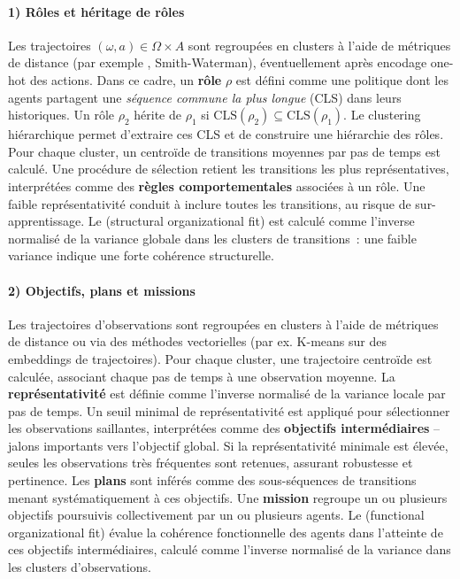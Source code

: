 \paragraph{1) Rôles et héritage de rôles}
Les trajectoires $(\omega, a) \in \Omega \times A$ sont regroupées en clusters à l’aide de métriques de distance (par exemple , Smith-Waterman), éventuellement après encodage one-hot des actions.
Dans ce cadre, un \textbf{rôle} $\rho$ est défini comme une politique dont les agents partagent une \textit{séquence commune la plus longue} (CLS) dans leurs historiques.
Un rôle $\rho_2$ hérite de $\rho_1$ si $\text{CLS}(\rho_2) \subseteq \text{CLS}(\rho_1)$.
Le clustering hiérarchique permet d’extraire ces CLS et de construire une hiérarchie des rôles.
Pour chaque cluster, un centroïde de transitions moyennes par pas de temps est calculé. Une procédure de sélection retient les transitions les plus représentatives, interprétées comme des \textbf{règles comportementales} associées à un rôle.
Une faible représentativité conduit à inclure toutes les transitions, au risque de sur-apprentissage.
Le \textbf{} (structural organizational fit) est calculé comme l’inverse normalisé de la variance globale dans les clusters de transitions~: une faible variance indique une forte cohérence structurelle.

\paragraph{2) Objectifs, plans et missions}
Les trajectoires d’observations sont regroupées en clusters à l’aide de métriques de distance ou via des méthodes vectorielles (par ex. K-means sur des embeddings de trajectoires). Pour chaque cluster, une trajectoire centroïde est calculée, associant chaque pas de temps à une observation moyenne.
La \textbf{représentativité} est définie comme l’inverse normalisé de la variance locale par pas de temps.
Un seuil minimal de représentativité est appliqué pour sélectionner les observations saillantes, interprétées comme des \textbf{objectifs intermédiaires} – jalons importants vers l’objectif global.
Si la représentativité minimale est élevée, seules les observations très fréquentes sont retenues, assurant robustesse et pertinence.
Les \textbf{plans} sont inférés comme des sous-séquences de transitions menant systématiquement à ces objectifs.
Une \textbf{mission} regroupe un ou plusieurs objectifs poursuivis collectivement par un ou plusieurs agents.
Le \textbf{} (functional organizational fit) évalue la cohérence fonctionnelle des agents dans l’atteinte de ces objectifs intermédiaires, calculé comme l’inverse normalisé de la variance dans les clusters d’observations.

